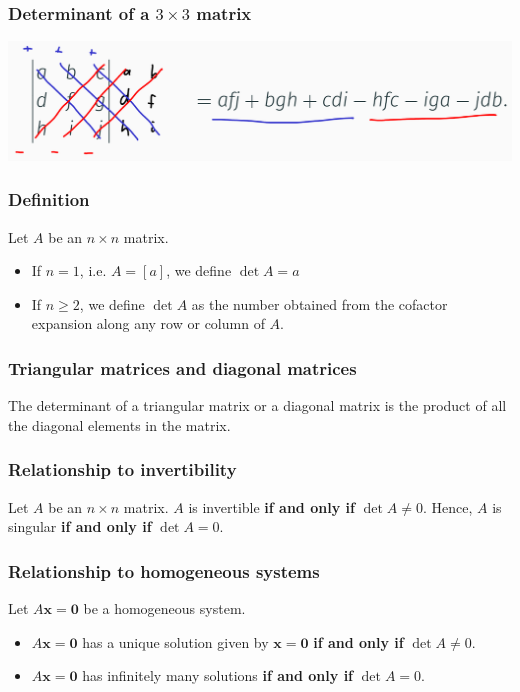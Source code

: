 \documentclass[11pt]{article}
\begin{document}
\subsubsection{Determinant of a \(3 \times 3\) matrix}
\label{sec:orgd7fe785}
\begin{center}
\includegraphics[width=.9\linewidth]{./images/determinant-of-a-3-by-3-matrix.png}
\end{center}
\subsubsection{Definition}
\label{sec:org1440132}
Let \(A\) be an \(n \times n\) matrix.
\begin{itemize}
\item If \(n = 1\), i.e. \(A = [a]\), we define \(\det A = a\)
\item If \(n \ge 2\), we define \(\det A\) as the number obtained from the cofactor expansion along any row or column of \(A\).
\end{itemize}
\subsubsection{Triangular matrices and diagonal matrices}
\label{sec:org5ae713e}
The determinant of a triangular matrix or a diagonal matrix is the product of all the diagonal elements in the matrix.
\subsubsection{Relationship to invertibility}
\label{sec:orgd382401}
Let \(A\) be an \(n \times n\) matrix. \(A\) is invertible \textbf{if and only if} \(\det A \ne 0\). Hence, \(A\) is singular \textbf{if and only if} \(\det A = 0\).
\subsubsection{Relationship to homogeneous systems}
\label{sec:orga85a454}
Let \(A \boldsymbol{x} = \boldsymbol{0}\) be a homogeneous system.

\begin{itemize}
\item \(A \boldsymbol{x} = \boldsymbol{0}\) has a unique solution given by \(\boldsymbol{x} = \boldsymbol{0}\) \textbf{if and only if} \(\det A \ne 0\).
\item \(A \boldsymbol{x} = \boldsymbol{0}\) has infinitely many solutions \textbf{if and only if} \(\det A = 0\).
\end{itemize}
\end{document}
